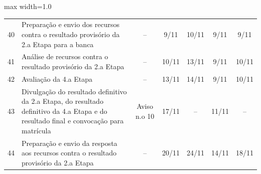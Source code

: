 \begin{quadro}[htb]
\begin{adjustbox}{max width=1.0\linewidth}
\begin{tabular}{|c|l|c|c|c|c|c|}
40 & Preparação e envio   dos recursos contra o resultado provisório da 2.a Etapa para a banca                                                  & –                   & 9/11                                                                            & 10/11                                 & 9/11                                                                            & 9/11                 \\
\rowcolor[HTML]{FCD5B4} 
41 & Análise de recursos   contra o resultado provisório da 2.a Etapa                                                                           & –                   & 10/11                                                                           & 13/11                                 & 9/11                                                                            & 10/11                \\
42 & Avaliação da 4.a   Etapa                                                                                                                   & –                   & 13/11                                                                           & 14/11                                 & 9/11                                                                            & 10/11                \\
\rowcolor[HTML]{92CDDC} 
43 & Divulgação do   resultado definitivo da 2.a Etapa, do resultado definitivo da 4.a Etapa e do   resultado final e convocação para matrícula & Aviso n.o 10        & 17/11                                                                           & –                                     & 11/11                                                                           & –                    \\
44 & Preparação e envio da   resposta aos recursos contra o resultado provisório da 2.a Etapa                                                   & –                   & 20/11                                                                           & 24/11                                 & 14/11                                                                           & 18/11 \\      \hline        
\end{tabular}


\end{adjustbox}
\end{quadro}



